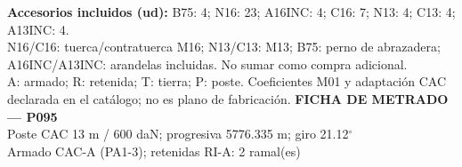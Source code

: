 \begingroup\scriptsize
\textbf{Accesorios incluidos (ud):} B75: 4; N16: 23; A16INC: 4; C16: 7; N13: 4; C13: 4; A13INC: 4.\\
N16/C16: tuerca/contratuerca M16; N13/C13: M13; B75: perno de abrazadera; A16INC/A13INC: arandelas incluidas. No sumar como compra adicional.\\
A: armado; R: retenida; T: tierra; P: poste. Coeficientes M01 y adaptación CAC declarada en el catálogo; no es plano de fabricación.
\endgroup\endgroup
\clearpage{}
\begingroup\small\setlength{\parskip}{3pt}\renewcommand{\arraystretch}{1.05}
\textbf{\large FICHA DE METRADO — P095}\\[4pt]
Poste CAC 13 m / 600 daN; progresiva 5776.335 m; giro 21.12\ensuremath{^\circ}\\
Armado CAC-A (PA1-3); retenidas RI-A: 2 ramal(es)\\
\begingroup\scriptsize
